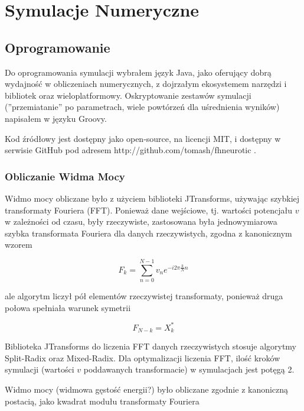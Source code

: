   \section{Symulacje Numeryczne}
  
  
  \subsection{Oprogramowanie}

  Do oprogramowania symulacji wybrałem język Java, jako oferujący dobrą wydajność w obliczeniach numerycznych, z dojrzałym ekosystemem narzędzi i bibliotek oraz wieloplatformowy. Oskryptowanie zestawów symulacji (''przemiatanie'' po parametrach, wiele powtórzeń dla uśrednienia wyników) napisałem w języku Groovy.
  
  Kod źródłowy jest dostępny jako open-source, na licencji MIT, i dostępny w serwisie GitHub pod adresem http://github.com/tomash/fhneurotic .

  \subsubsection{Obliczanie Widma Mocy}

  Widmo mocy obliczane było z użyciem biblioteki JTransforms, używając szybkiej transformaty Fouriera (FFT). Ponieważ dane wejściowe, tj. wartości potencjału $v$ w zależności od czasu, były rzeczywiste, zastosowana była jednowymiarowa szybka transformata Fouriera dla danych rzeczywistych, zgodna z kanonicznym wzorem

  \begin{equation}
    F_k = \sum\limits^{N-1}_{n=0} v_n e^{-i2\pi \frac{k}{N} n}
  \end{equation}

  ale algorytm liczył pół elementów rzeczywistej transformaty, ponieważ druga połowa spełniała warunek symetrii

  \begin{equation}
    F_{N-k} = X^{*}_{k}
  \end{equation}

  Biblioteka JTransforms do liczenia FFT danych rzeczywistych stosuje algorytmy Split-Radix oraz Mixed-Radix. Dla optymalizacji liczenia FFT, ilość kroków symulacji (wartości $v$ poddawanych transformacie) w symulacjach jest potęgą 2.

  Widmo mocy (widmowa gęstość energii?) było obliczane zgodnie z kanoniczną postacią, jako kwadrat modułu  transformaty Fouriera


